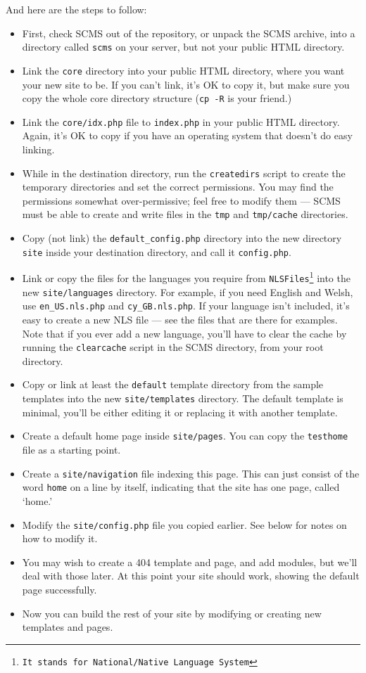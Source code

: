 And here are the steps to follow:
\begin{itemize}
\item First, check SCMS out of the repository, or unpack the SCMS archive,
into a directory called \texttt{scms} on your server, but not your public HTML
directory.
\item Link the \texttt{core} directory into your public HTML directory, where
you want your new site to be. If you can't link, it's OK to copy it, but make
sure you copy the whole core directory structure (\texttt{cp -R} is your
friend.)

\item Link the \texttt{core/idx.php} file to \texttt{index.php} in your public HTML directory. Again, it's OK to copy if you have an operating system that doesn't do easy linking.
\item While in the destination directory, run the \texttt{createdirs} script to create the temporary directories and set the correct permissions. You may find the permissions somewhat over-permissive;
feel free to modify them --- SCMS must be able to create and write files in the \texttt{tmp} and \texttt{tmp/cache} directories.
\item Copy (not link) the \texttt{default\_config.php} directory into the
new directory \texttt{site} inside your destination directory, and call it \texttt{config.php}.
\item Link or copy the files for the languages you require from \texttt{NLSFiles\footnote{It stands for National/Native Language System}} into the new \texttt{site/languages} directory.
For example, if you need English and Welsh, use \texttt{en\_US.nls.php} and \texttt{cy\_GB.nls.php}. If your language isn't included, it's easy to create a new NLS file --- see the files that are
there for examples.
Note that if you ever add a new language, you'll have to clear the cache
by running the \texttt{clearcache} script in the SCMS directory, from your
root directory.
\item Copy or link at least the \texttt{default} template directory from the sample templates into the new \texttt{site/templates} directory. The default template is minimal, you'll be either editing it
or replacing it with another template.
\item Create a default home page inside \texttt{site/pages}. You can copy the \texttt{testhome} file as a starting point.
\item Create a \texttt{site/navigation} file indexing this page. This can just consist of the word \texttt{home} on a line by itself, indicating that the site has one page, called `home.'
\item Modify the \texttt{site/config.php} file you copied earlier. See below for notes on how to modify it.
\item You may wish to create a 404 template and page, and add modules, but we'll deal with those later. At this point your site should work, showing the default page successfully.
\item Now you can build the rest of your site by modifying or creating new templates and pages.
\end{itemize}
